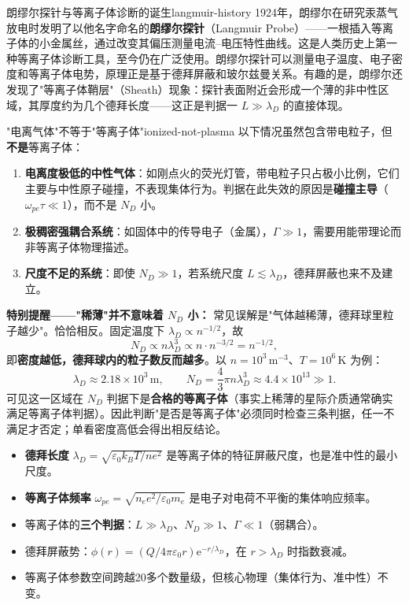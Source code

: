 \documentclass[12pt,a4paper,openany,oneside]{book}
\newcommand{\ee}{\mathrm{e}}
\newcommand{\eps}{\varepsilon}
\begin{document}
\begin{history}{朗缪尔探针与等离子体诊断的诞生}{langmuir-history}
1924年，朗缪尔在研究汞蒸气放电时发明了以他名字命名的\textbf{朗缪尔探针}（Langmuir Probe）——一根插入等离子体的小金属丝，通过改变其偏压测量电流--电压特性曲线。这是人类历史上第一种等离子体诊断工具，至今仍在广泛使用。朗缪尔探针可以测量电子温度、电子密度和等离子体电势，原理正是基于德拜屏蔽和玻尔兹曼关系。有趣的是，朗缪尔还发现了"等离子体鞘层"（Sheath）现象：探针表面附近会形成一个薄的非中性区域，其厚度约为几个德拜长度——这正是判据一 $L \gg \lambda_D$ 的直接体现。
\end{history}

\begin{warning}{"电离气体"不等于"等离子体"}{ionized-not-plasma}
以下情况虽然包含带电粒子，但\textbf{不是}等离子体：
\begin{enumerate}
\item \textbf{电离度极低的中性气体}：如刚点火的荧光灯管，带电粒子只占极小比例，它们主要与中性原子碰撞，不表现集体行为。判据在此失效的原因是\textbf{碰撞主导}（$\omega_{pe}\tau \ll 1$），而不是 $N_D$ 小。
\item \textbf{极稠密强耦合系统}：如固体中的传导电子（金属），$\Gamma \gg 1$，需要用能带理论而非等离子体物理描述。
\item \textbf{尺度不足的系统}：即使 $N_D \gg 1$，若系统尺度 $L \lesssim \lambda_D$，德拜屏蔽也来不及建立。
\end{enumerate}

\textbf{特别提醒——"稀薄"并不意味着 $N_D$ 小：} 常见误解是"气体越稀薄，德拜球里粒子越少"。恰恰相反。固定温度下 $\lambda_D \propto n^{-1/2}$，故
\[
N_D \propto n\lambda_D^3 \propto n\cdot n^{-3/2} = n^{-1/2},
\]
即\textbf{密度越低，德拜球内的粒子数反而越多}。以 $n=10^3\,\mathrm{m^{-3}}$、$T=10^6\,\mathrm{K}$ 为例：
\[
\lambda_D \approx 2.18\times10^{3}\,\mathrm{m},
\qquad
N_D = \frac{4}{3}\pi n\lambda_D^3 \approx 4.4\times10^{13} \gg 1 .
\]
可见这一区域在 $N_D$ 判据下是\textbf{合格的等离子体}（事实上稀薄的星际介质通常确实满足等离子体判据）。因此判断"是否是等离子体"必须同时检查三条判据，任一不满足才否定；单看密度高低会得出相反结论。
\end{warning}

\begin{chapterreview}
\begin{itemize}
\item \textbf{德拜长度} $\lambda_D = \sqrt{\eps_0 k_BT/ne^2}$ 是等离子体的特征屏蔽尺度，也是准中性的最小尺度。
\item \textbf{等离子体频率} $\omega_{pe} = \sqrt{n_e e^2/\eps_0 m_e}$ 是电子对电荷不平衡的集体响应频率。
\item 等离子体的\textbf{三个判据}：$L \gg \lambda_D$、$N_D \gg 1$、$\Gamma \ll 1$（弱耦合）。
\item 德拜屏蔽势：$\phi(r) = (Q/4\pi\eps_0 r)\ee^{-r/\lambda_D}$，在 $r>\lambda_D$ 时指数衰减。
\item 等离子体参数空间跨越20多个数量级，但核心物理（集体行为、准中性）不变。
\end{itemize}
\end{chapterreview}
\end{document}
